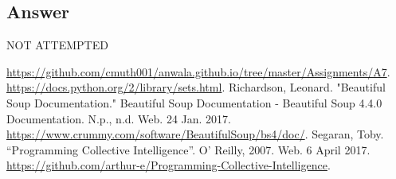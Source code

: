 \documentclass[letterpaper,11pt]{article}
\begin{document}
\subsection*{Answer}

\begin{center}
\Huge{NOT ATTEMPTED}
\end{center}


\clearpage



\begin{thebibliography}{9}
\url{https://github.com/cmuth001/anwala.github.io/tree/master/Assignments/A7}.
\url{https://docs.python.org/2/library/sets.html}.
Richardson, Leonard. "Beautiful Soup Documentation." Beautiful Soup Documentation - Beautiful Soup 4.4.0 Documentation. N.p., n.d. Web. 24 Jan. 2017. \url{https://www.crummy.com/software/BeautifulSoup/bs4/doc/}.
Segaran, Toby. ``Programming Collective Intelligence''. O' Reilly, 2007. Web. 6 April 2017. \url{https://github.com/arthur-e/Programming-Collective-Intelligence}.
\end{thebibliography}
\end{document}
